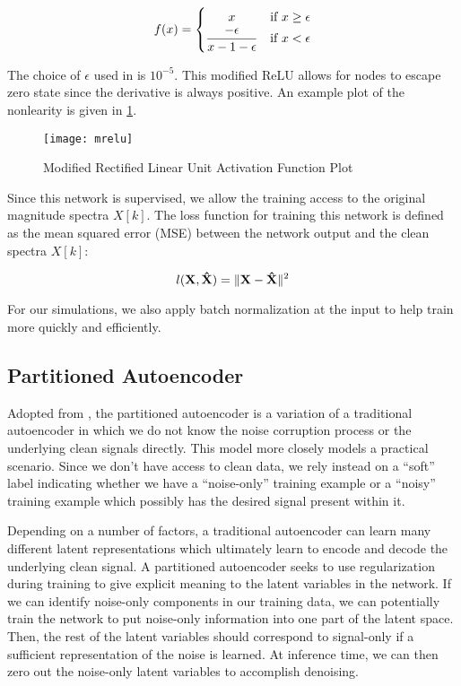 \begin{equation}
f(x) =
    \begin{cases}
        \hfill x \hfill & \text{if $x \ge \epsilon$}\\
        \hfill \dfrac{-\epsilon}{x-1-\epsilon} & \text{if $x < \epsilon$}
    \end{cases}
\end{equation}

The choice of $\epsilon$ used in \cite{liu2014experiments} is $10^{-5}$. This modified ReLU allows for nodes to escape zero state since the derivative is always positive. An example plot of the nonlearity is given in \ref{fig:mrelu}.

\begin{figure}[!ht]
\centering
\texttt{[image: mrelu]}
\caption[Modified Rectified Linear Unit Activation]{Modified Rectified Linear Unit Activation Function Plot}
\label{fig:mrelu}
\end{figure}

Since this network is supervised, we allow the training access to the original magnitude spectra $X[k]$. The loss function for training this network is defined as the mean squared error (MSE) between the network output and the clean spectra $X[k]$:

\begin{equation}
l(\mathbf{X},\mathbf{\hat{X}}) = \lVert\mathbf{X}-\mathbf{\hat{X}}\rVert^{2}
\end{equation}

For our simulations, we also apply batch normalization at the input to help train more quickly and efficiently.

\subsection{Partitioned Autoencoder}

Adopted from \cite{stow}, the partitioned autoencoder is a variation of a traditional autoencoder in which we do not know the noise corruption process or the underlying clean signals directly. This model more closely models a practical scenario. Since we don't have access to clean data, we rely instead on a ``soft'' label indicating whether we have a ``noise-only'' training example or a ``noisy'' training example which possibly has the desired signal present within it.

Depending on a number of factors, a traditional autoencoder can learn many different latent representations which ultimately learn to encode and decode the underlying clean signal. A partitioned autoencoder seeks to use regularization during training to give explicit meaning to the latent variables in the network. If we can identify noise-only components in our training data, we can potentially train the network to put noise-only information into one part of the latent space. Then, the rest of the latent variables should correspond to signal-only if a sufficient representation of the noise is learned. At inference time, we can then zero out the noise-only latent variables to accomplish denoising.

